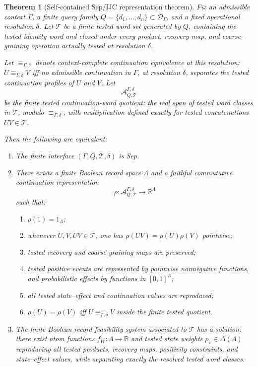 \documentclass[11pt]{article}
\newtheorem{theorem}{Theorem}[section]
\begin{document}
\begin{theorem}[Self-contained Sep/IJC representation theorem]
\label{thm:sep-ijc-representation}
Fix an admissible context \(\Gamma\), a finite query family
\(Q=\{d_1,\ldots,d_n\}\subset \mathcal D_\Gamma\), and a fixed
operational resolution \(\delta\).  Let \(\mathcal T\) be a finite
tested word set generated by \(Q\), containing the tested identity
word and closed under every product, recovery map, and
coarse-graining operation actually tested at resolution \(\delta\).

Let \(\equiv_{\Gamma,\delta}\) denote context-complete continuation
equivalence at this resolution: \(U\equiv_{\Gamma,\delta}V\) iff no
admissible continuation in \(\Gamma\), at resolution \(\delta\), separates
the tested continuation profiles of \(U\) and \(V\).  Let
\[
  \mathcal A^{\Gamma,\delta}_{Q,\mathcal T}
\]
be the finite tested continuation-word quotient: the real span of
tested word classes in \(\mathcal T\), modulo
\(\equiv_{\Gamma,\delta}\), with multiplication defined exactly for
tested concatenations \(UV\in\mathcal T\).

Then the following are equivalent:
\begin{enumerate}[label=(\roman*),leftmargin=2em]
\item The finite interface \((\Gamma,Q,\mathcal T,\delta)\) is Sep.

\item There exists a finite Boolean record space \(\Lambda\) and a
faithful commutative continuation representation
\[
  \rho:\mathcal A^{\Gamma,\delta}_{Q,\mathcal T}\to \mathbb R^\Lambda
\]
such that:
\begin{enumerate}[label=(\alph*),leftmargin=2em]
\item \(\rho(1)=1_\Lambda\);
\item whenever \(U,V,UV\in\mathcal T\), one has
\(\rho(UV)=\rho(U)\rho(V)\) pointwise;
\item tested recovery and coarse-graining maps are preserved;
\item tested positive events are represented by pointwise nonnegative
functions, and probabilistic effects by functions in \([0,1]^\Lambda\);
\item all tested state--effect and continuation values are reproduced;
\item \(\rho(U)=\rho(V)\) iff
\(U\equiv_{\Gamma,\delta}V\) inside the finite tested quotient.
\end{enumerate}

\item The finite Boolean-record feasibility system associated to
\(\mathcal T\) has a solution: there exist atom functions
\(f_W:\Lambda\to\mathbb R\) and tested state weights
\(p_s\in\Delta(\Lambda)\) reproducing all tested products,
recovery maps, positivity constraints, and state--effect values,
while separating exactly the resolved tested word classes.
\end{enumerate}


\end{theorem}
\end{document}
